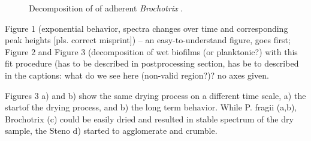 \documentclass[foods,article,submit,moreauthors,pdftex]{Definitions/mdpi}
\begin{document}
\begin{figure}[ht]
  \caption{Decomposition of of adherent  \textit{Brochotrix} .}
 \label{fig:fitting}
\end{figure}
Figure 1 (exponential behavior, spectra changes over time and corresponding peak heights [pls. correct misprint]) – an easy-to-understand figure, goes first; Figure 2 and Figure 3 (decomposition of wet biofilms (or planktonic?) with this fit procedure (has to be described in postprocessing section, has be to described in the captions: what do we see here (non-valid region?)? no axes given.

Figures 3  a) and b) show the same drying process on a different time scale, a) the startof the drying process, and b) the long term behavior. While P. fragii (a,b), Brochotrix (c) could be easily dried and resulted in stable spectrum of the dry sample,  the Steno d) started to agglomerate and crumble.  
\subsection{}


\end{document}
